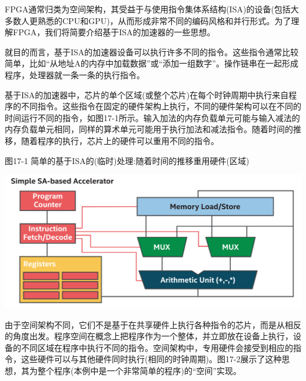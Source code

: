 FPGA通常归类为空间架构，其受益于与使用指令集体系结构(ISA)的设备(包括大多数人更熟悉的CPU和GPU)，从而形成非常不同的编码风格和并行形式。为了理解FPGA，我们将简要介绍基于ISA的加速器的一些思想。\par

就目的而言，基于ISA的加速器设备可以执行许多不同的指令。这些指令通常比较简单，比如“从地址A的内存中加载数据”或“添加一组数字”。操作链串在一起形成程序，处理器就一条一条的执行指令。\par

基于ISA的加速器中，芯片的单个区域(或整个芯片)在每个时钟周期中执行来自程序的不同指令。这些指令在固定的硬件架构上执行，不同的硬件架构可以在不同的时间运行不同的指令，如图17-1所示。输入加法的内存负载单元可能与输入减法的内存负载单元相同，同样的算术单元可能用于执行加法和减法指令。随着时间的推移，随着程序的执行，芯片上的硬件可以重用不同的指令。\par

\hspace*{\fill} \par %
图17-1 简单的基于ISA的(临时)处理:随着时间的推移重用硬件(区域)
\begin{center}
	\includegraphics[width=1.0\textwidth]{content/chapter-17/images/2}
\end{center}

由于空间架构不同，它们不是基于在共享硬件上执行各种指令的芯片，而是从相反的角度出发。程序空间在概念上把程序作为一个整体，并立即放在设备上执行，设备的不同区域在程序中执行不同的指令。空间架构中，专用硬件会接受到相应的指令，这些硬件可以与其他硬件同时执行(相同的时钟周期)。图17-2展示了这种思想，其为整个程序(本例中是一个非常简单的程序)的“空间”实现。\par

